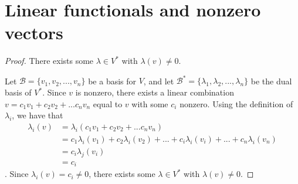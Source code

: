 \section{Linear functionals and nonzero vectors}
\begin{proof} There exists some $\lambda \in V^*$ with $\lambda(v) \neq 0$.\gap

    Let $\mathcal{B} = \{v_1,v_2,...,v_n\}$ be a basis for $V$, and
    let $\mathcal{B}^* = \{\lambda_1,\lambda_2,...,\lambda_n\}$ 
    be the dual basis of $V^*$.
    Since $v$ is nonzero, there exists a linear combination
    $v = c_1v_1 + c_2v_2 + ... c_nv_n$ equal to $v$ with some $c_i$ nonzero.
    Using the definition of $\lambda_i$, we have that
    \begin{align} 
        \lambda_i(v) 
        &= \lambda_i(c_1v_1 + c_2v_2 + ... c_nv_n)\\
        &= c_1\lambda_i(v_1) + c_2\lambda_i(v_2) + ... + c_i\lambda_i(v_i) + ... + c_n\lambda_i(v_n) \\
        &= c_i\lambda_j(v_i)\\
        &= c_i
    \end{align}.
    Since $\lambda_i(v) = c_i \neq 0$, there exists some $\lambda \in V^*$ with $\lambda(v) \neq 0$.
\end{proof}

